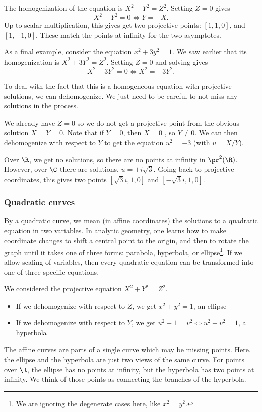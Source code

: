 \documentclass[12pt]{amsart}
\theoremstyle{plain}
\theoremstyle{definition}
\theoremstyle{remark}
\begin{document}
The homogenization of the equation is $X^2-Y^2=Z^2$.
Setting $Z=0$ gives 
\[ X^2-Y^2=0 \iff Y=\pm X. \]
Up to scalar multiplication, this gives get two projective points:
$[1,1,0]$, and $[1,-1,0]$.  These match the points at infinity for the
two asymptotes.

As a final example, consider the equation
$x^2+3y^2=1$.  We saw earlier that its homogenization is
$X^2+3Y^2=Z^2$.  Setting $Z=0$ and solving gives
\[  X^2+3Y^2=0 \iff X^2=-3Y^2. \]

To deal with the fact that this is a homogeneous equation with
projective solutions, we can dehomogenize.  We just need to be careful
to not miss any solutions in the process.

We already have $Z=0$ so we do not get a projective point from the
obvious solution $X=Y=0$.  Note that if $Y=0$, then $X=0$ \con, so
$Y\neq 0$.  We can then dehomogenize with respect to $Y$ to get the
equation $u^2=-3$ (with $u=X/Y$).

Over $\R$, we get no solutions, so there are no points at infinity in
$\pr^2(\R)$.  However, over $\C$ there are solutions, $u=\pm i\sqrt
3$.  Going back to projective coordinates, this gives two points
$[\sqrt{3}i,1,0]$ and $[-\sqrt{3}i,1,0]$. 

\subsubsection{Quadratic curves}

By a quadratic curve, we mean (in affine coordinates) the solutions to
a quadratic equation in two variables.  In analytic geometry, one
learns how to make coordinate changes to shift a central point to the
origin, and then to rotate the graph until it takes one of three
forms: parabola, hyperbola, or ellipse\footnote{We are ignoring the
  degenerate cases here, like $x^2=y^2$.}.  If we allow scaling of
variables, then every quadratic equation can be transformed into one
of three specific equations.

We considered the projective equation $X^2+Y^2=Z^2$.
\begin{itemize}
\item If we dehomogenize with respect to $Z$, we get $x^2+y^2=1$, an ellipse
\item If we dehomogenize with respect to $Y$, we get $u^2+1=v^2\iff u^2-v^2=1$, a hyperbola
\end{itemize}
The affine curves are parts of a single curve which may be missing
points.  Here, the ellipse and the hyperbola are just two views of the
same curve.  For points over $\R$, the ellipse has no points at
infinity, but the hyperbola has two points at infinity.  We think of
those points as connecting the branches of the hyperbola.
\end{document}
